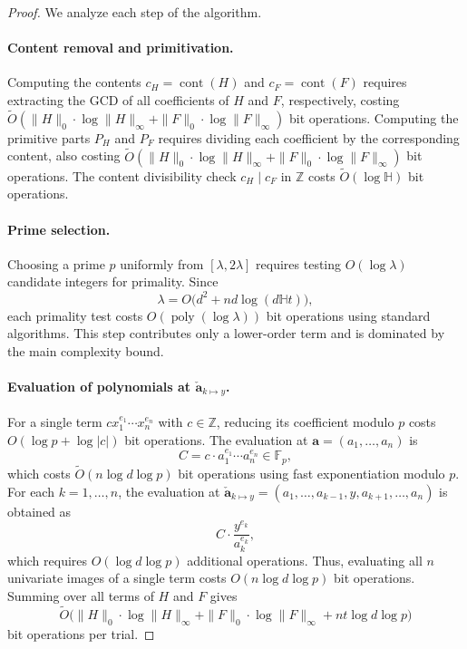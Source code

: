 \documentclass{article}
\numberwithin{equation}{section}
\begin{document}
\begin{proof}
We analyze each step of the algorithm.

\paragraph{Content removal and primitivation.}
Computing the contents $c_H = \operatorname{cont}(H)$ and $c_F = \operatorname{cont}(F)$ requires extracting the GCD of all coefficients of $H$ and $F$, respectively, costing $\widetilde{O}(\|H\|_0\cdot \log\|H\|_{\infty}+ \|F\|_0\cdot \log \|F\|_{\infty})$ bit operations. Computing the primitive parts $P_H$ and $P_F$ requires dividing each coefficient by the corresponding content, also costing $\widetilde{O}(\|H\|_0\cdot \log\|H\|_{\infty}+ \|F\|_0\cdot \log \|F\|_{\infty})$  bit operations. The content divisibility check $c_H \mid c_F$ in $\mathbb{Z}$ costs $\widetilde{O}(\log \mathbb{H})$ bit operations. 

\paragraph{Prime selection.}
Choosing a prime $p$ uniformly from $[\lambda, 2\lambda]$ requires testing $O(\log \lambda)$ candidate integers for primality. Since
\[
\lambda = O\bigl(d^2 + nd\log(d\mathbb{H} t)\bigr),
\]
each primality test costs $O(\operatorname{poly}(\log \lambda))$ bit operations using standard algorithms. This step contributes only a lower-order term and is dominated by the main complexity bound.

\paragraph{Evaluation of polynomials at $\mathbf{\check{a}}_{k \mapsto y} $.}
For a single term $c x_1^{e_1}\cdots x_n^{e_n}$ with $c \in \mathbb{Z}$, reducing its coefficient modulo $p$ costs $O(\log p + \log |c|)$ bit operations. The evaluation at $\mathbf{a} = (a_1,\dots,a_n)$ is
\[
C = c \cdot a_1^{e_1}\cdots a_n^{e_n} \in \mathbb{F}_p,
\]
which costs $\widetilde{O}(n \log d \log p)$ bit operations using fast exponentiation modulo $p$. For each $k=1,\dots,n$, the evaluation at $\mathbf{\check{a}}_{k \mapsto y}  = (a_1,\dots,a_{k-1}, y, a_{k+1},\dots,a_n)$ is obtained as
\[
C \cdot \frac{y^{e_k}}{a_k^{e_k}},
\]
which requires $O(\log d \log p)$ additional operations. Thus, evaluating all $n$ univariate images of a single term costs $O(n \log d \log p)$ bit operations. Summing over all terms of $H$ and $F$ gives
\[
\widetilde{O}\bigl(\|H\|_0\cdot \log\|H\|_{\infty}+ \|F\|_0\cdot \log \|F\|_{\infty} + n t \log d \log p \bigr)
\]
bit operations per trial.


\end{proof}
\end{document}
